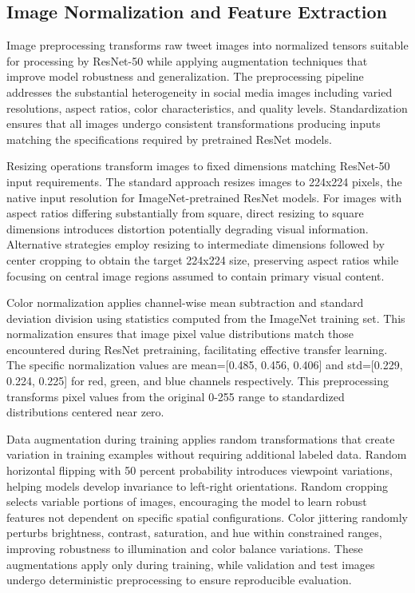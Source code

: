 \documentclass[12pt,a4paper]{report}
\begin{document}
\subsection{Image Normalization and Feature Extraction}

Image preprocessing transforms raw tweet images into normalized tensors suitable for processing by ResNet-50 while applying augmentation techniques that improve model robustness and generalization. The preprocessing pipeline addresses the substantial heterogeneity in social media images including varied resolutions, aspect ratios, color characteristics, and quality levels. Standardization ensures that all images undergo consistent transformations producing inputs matching the specifications required by pretrained ResNet models.

Resizing operations transform images to fixed dimensions matching ResNet-50 input requirements. The standard approach resizes images to 224x224 pixels, the native input resolution for ImageNet-pretrained ResNet models. For images with aspect ratios differing substantially from square, direct resizing to square dimensions introduces distortion potentially degrading visual information. Alternative strategies employ resizing to intermediate dimensions followed by center cropping to obtain the target 224x224 size, preserving aspect ratios while focusing on central image regions assumed to contain primary visual content.

Color normalization applies channel-wise mean subtraction and standard deviation division using statistics computed from the ImageNet training set. This normalization ensures that image pixel value distributions match those encountered during ResNet pretraining, facilitating effective transfer learning. The specific normalization values are mean=[0.485, 0.456, 0.406] and std=[0.229, 0.224, 0.225] for red, green, and blue channels respectively. This preprocessing transforms pixel values from the original 0-255 range to standardized distributions centered near zero.

Data augmentation during training applies random transformations that create variation in training examples without requiring additional labeled data. Random horizontal flipping with 50 percent probability introduces viewpoint variations, helping models develop invariance to left-right orientations. Random cropping selects variable portions of images, encouraging the model to learn robust features not dependent on specific spatial configurations. Color jittering randomly perturbs brightness, contrast, saturation, and hue within constrained ranges, improving robustness to illumination and color balance variations. These augmentations apply only during training, while validation and test images undergo deterministic preprocessing to ensure reproducible evaluation.
\end{document}
